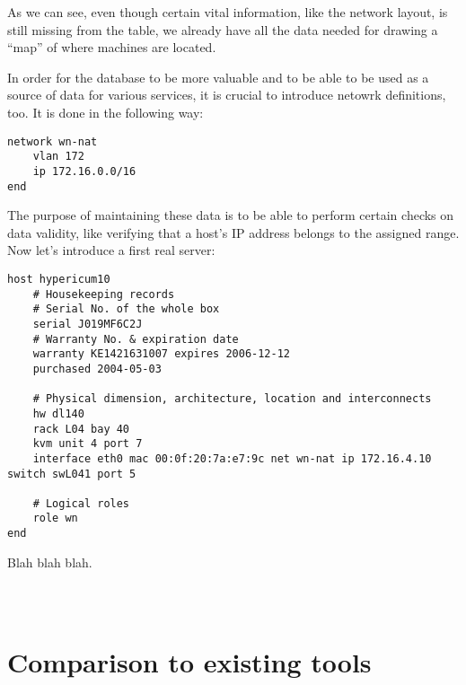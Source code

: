 \documentclass[11pt]{article}
\begin{document}
As we can see, even though certain vital information, like the network layout,
is still missing from the table, we already have all the data needed for drawing
a ``map'' of where machines are located.

In order for the database to be more valuable and to be able to be used as a
source of data for various services, it is crucial to introduce netowrk
definitions, too.  It is done in the following way:

{\scriptsize
\begin{verbatim}
network wn-nat
    vlan 172
    ip 172.16.0.0/16
end
\end{verbatim}
}

The purpose of maintaining these data is to be able to perform certain checks on
data validity, like verifying that a host's IP address belongs to the assigned
range.  Now let's introduce a first real server:

{\scriptsize
\begin{verbatim}
host hypericum10
    # Housekeeping records
    # Serial No. of the whole box
    serial J019MF6C2J
    # Warranty No. & expiration date
    warranty KE1421631007 expires 2006-12-12
    purchased 2004-05-03

    # Physical dimension, architecture, location and interconnects
    hw dl140
    rack L04 bay 40
    kvm unit 4 port 7
    interface eth0 mac 00:0f:20:7a:e7:9c net wn-nat ip 172.16.4.10 switch swL041 port 5

    # Logical roles
    role wn
end
\end{verbatim}
}

Blah blah blah.

{\scriptsize
\begin{verbatim}
\end{verbatim}
}

{\scriptsize
\begin{verbatim}
\end{verbatim}
}

{\scriptsize
\begin{verbatim}
\end{verbatim}
}

\section{Comparison to existing tools}
\end{document}
